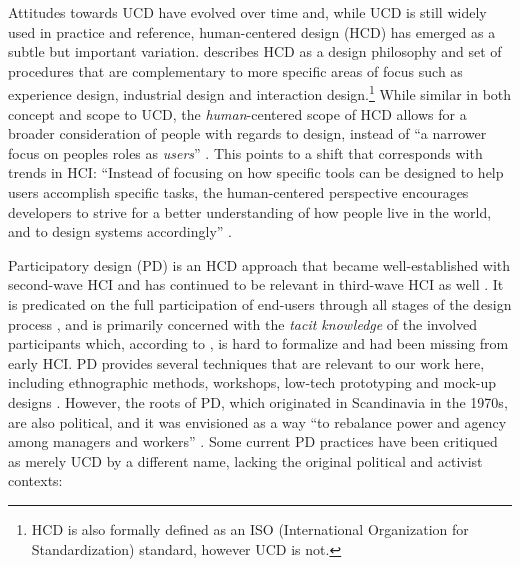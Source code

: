 \documentclass[]{interact}
\theoremstyle{plain}%
\theoremstyle{definition}
\theoremstyle{remark}
\begin{document}
Attitudes towards UCD have evolved over time and, while UCD is still widely used in practice and reference, human-centered design (HCD) has emerged as a subtle but important variation. \citet{Norman2013} describes HCD as a design philosophy and set of procedures that are complementary to more specific areas of focus such as experience design, industrial design and interaction design.\footnote{HCD is also formally defined as an ISO (International Organization for Standardization) standard, however UCD is not.} 
While similar in both concept and scope to UCD, the \emph{human}-centered scope of HCD allows for a broader consideration of people with regards to design, instead of ``a narrower focus on peoples roles as \emph{users}'' \citep[p. 45]{Steen2011}. This points to a shift that corresponds with trends in HCI: ``Instead of focusing on how specific tools can be designed to help users accomplish specific tasks, the human-centered perspective encourages developers to strive for a better understanding of how people live in the world, and to design systems accordingly'' \citep[p. 45]{El-shimy2014}. 

Participatory design (PD) is an HCD approach that became well-established with second-wave HCI \citep{Bodker2015} and has continued to be relevant in third-wave HCI as well \citep{Muller2012}. It is predicated on the full participation of end-users through all stages of the design process \citep{Steen2011}, and is primarily concerned with the \emph{tacit knowledge} of the involved participants which, according to \citet{Spinuzzi2005}, is hard to formalize and had been missing from early HCI. PD provides several techniques that are relevant to our work here, including ethnographic methods, workshops, low-tech prototyping and mock-up designs \citep{Muller1993a}. However, the roots of PD, which originated in Scandinavia in the 1970s, are also political, and it was envisioned as a way ``to rebalance power and agency among managers and workers'' \citep[p. 1]{Bannon2018}. Some current PD practices have been critiqued as merely UCD by a different name, lacking the original political and activist contexts: 
\end{document}

